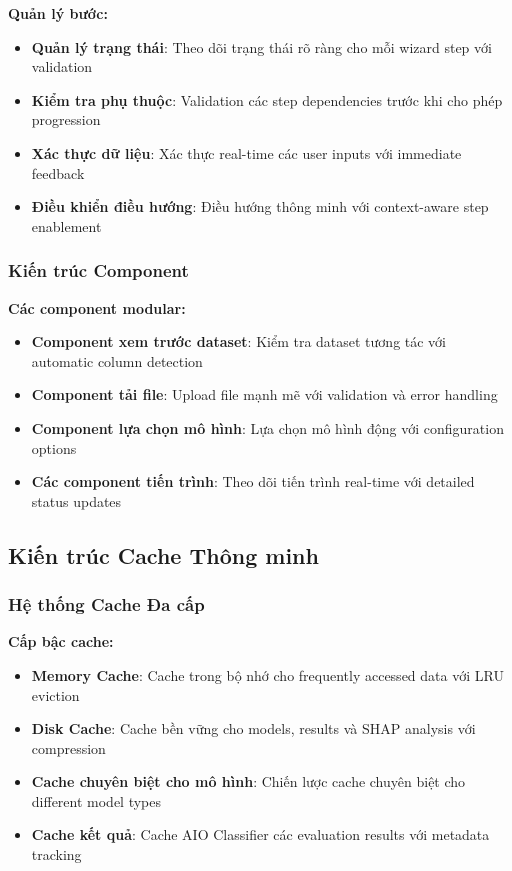 \textbf{Quản lý bước:}
\begin{itemize}
    \item \textbf{Quản lý trạng thái}: Theo dõi trạng thái rõ ràng cho mỗi wizard step với validation
    \item \textbf{Kiểm tra phụ thuộc}: Validation các step dependencies trước khi cho phép progression
    \item \textbf{Xác thực dữ liệu}: Xác thực real-time các user inputs với immediate feedback
    \item \textbf{Điều khiển điều hướng}: Điều hướng thông minh với context-aware step enablement
        \end{itemize}

\subsubsection{Kiến trúc Component}

\textbf{Các component modular:}
\begin{itemize}
    \item \textbf{Component xem trước dataset}: Kiểm tra dataset tương tác với automatic column detection
    \item \textbf{Component tải file}: Upload file mạnh mẽ với validation và error handling
    \item \textbf{Component lựa chọn mô hình}: Lựa chọn mô hình động với configuration options
    \item \textbf{Các component tiến trình}: Theo dõi tiến trình real-time với detailed status updates
\end{itemize}

\subsection{Kiến trúc Cache Thông minh}\label{subsec:caching-architecture}

\subsubsection{Hệ thống Cache Đa cấp}\label{subsec:multi-level-caching-system}

\textbf{Cấp bậc cache:}
\begin{itemize}
    \item \textbf{Memory Cache}: Cache trong bộ nhớ cho frequently accessed data với LRU eviction
    \item \textbf{Disk Cache}: Cache bền vững cho models, results và SHAP analysis với compression
    \item \textbf{Cache chuyên biệt cho mô hình}: Chiến lược cache chuyên biệt cho different model types
    \item \textbf{Cache kết quả}: Cache AIO Classifier các evaluation results với metadata tracking
\end{itemize}

